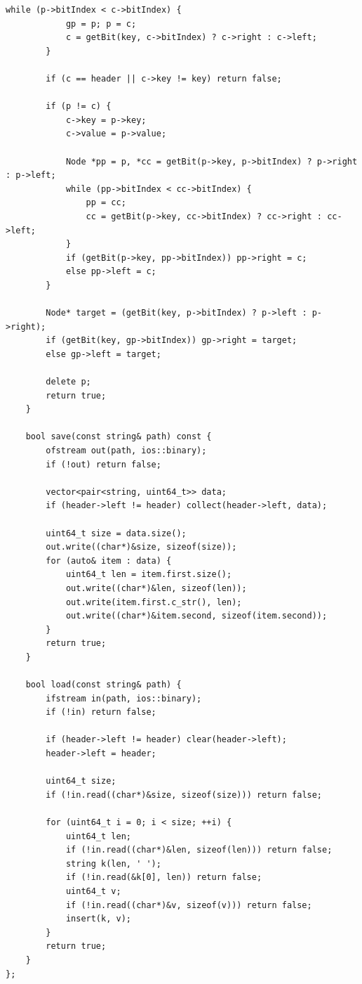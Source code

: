 \begin{lstlisting}[breaklines=true, postbreak=\mbox{\textcolor{red}{$\hookrightarrow$}\space}]
        while (p->bitIndex < c->bitIndex) {
            gp = p; p = c;
            c = getBit(key, c->bitIndex) ? c->right : c->left;
        }

        if (c == header || c->key != key) return false;

        if (p != c) {
            c->key = p->key;
            c->value = p->value;

            Node *pp = p, *cc = getBit(p->key, p->bitIndex) ? p->right : p->left;
            while (pp->bitIndex < cc->bitIndex) {
                pp = cc;
                cc = getBit(p->key, cc->bitIndex) ? cc->right : cc->left;
            }
            if (getBit(p->key, pp->bitIndex)) pp->right = c;
            else pp->left = c;
        }

        Node* target = (getBit(key, p->bitIndex) ? p->left : p->right);
        if (getBit(key, gp->bitIndex)) gp->right = target;
        else gp->left = target;

        delete p;
        return true;
    }

    bool save(const string& path) const {
        ofstream out(path, ios::binary);
        if (!out) return false;

        vector<pair<string, uint64_t>> data;
        if (header->left != header) collect(header->left, data);

        uint64_t size = data.size();
        out.write((char*)&size, sizeof(size));
        for (auto& item : data) {
            uint64_t len = item.first.size();
            out.write((char*)&len, sizeof(len));
            out.write(item.first.c_str(), len);
            out.write((char*)&item.second, sizeof(item.second));
        }
        return true;
    }

    bool load(const string& path) {
        ifstream in(path, ios::binary);
        if (!in) return false;

        if (header->left != header) clear(header->left);
        header->left = header;

        uint64_t size;
        if (!in.read((char*)&size, sizeof(size))) return false;

        for (uint64_t i = 0; i < size; ++i) {
            uint64_t len;
            if (!in.read((char*)&len, sizeof(len))) return false;
            string k(len, ' ');
            if (!in.read(&k[0], len)) return false;
            uint64_t v;
            if (!in.read((char*)&v, sizeof(v))) return false;
            insert(k, v);
        }
        return true;
    }
};


\end{lstlisting}
